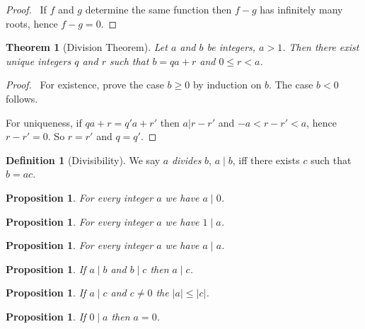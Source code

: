 \documentclass{article}
\let\qed\relax
\newtheorem{proposition}[axiom]{Proposition}
\newtheorem{theorem}[axiom]{Theorem}
\theoremstyle{definition}
\newtheorem{definition}[axiom]{Definition}
\begin{document}
    \begin{proof}
        \pf\ If $f$ and $g$ determine the same function then $f - g$ has infinitely many roots, hence
        $f - g = 0$. \qed
    \end{proof}

    \begin{theorem}[Division Theorem]
        Let $a$ and $b$ be integers, $a > 1$. Then there exist unique integers $q$ and $r$ such that
        $b = qa + r$ and $0 \leq r < a$.
    \end{theorem}

    \begin{proof}
        \pf\ For existence, prove the case $b \geq 0$ by induction on $b$. The case $b < 0$ follows.

        For uniqueness, if $qa + r = q'a + r'$ then $a | r - r'$ and $-a < r - r' < a$, hence $r - r' = 0$.
        So $r = r'$ and $q = q'$. \qed
    \end{proof}

    \begin{definition}[Divisibility]
        We say $a$ \emph{divides} $b$, $a \mid b$, iff there exists $c$ such that $b = ac$.
    \end{definition}

    \begin{proposition}
        For every integer $a$ we have $a \mid 0$.
    \end{proposition}

    \begin{proposition}
        For every integer $a$ we have $1 \mid a$.
    \end{proposition}

    \begin{proposition}
        For every integer $a$ we have $a \mid a$.
    \end{proposition}

    \begin{proposition}
        If $a \mid b$ and $b \mid c$ then $a \mid c$.
    \end{proposition}

    \begin{proposition}
        If $a \mid c$ and $c \neq 0$ the $|a| \leq |c|$.
    \end{proposition}

    \begin{proposition}
        If $0 \mid a$ then $a = 0$.
    \end{proposition}
\end{document}
